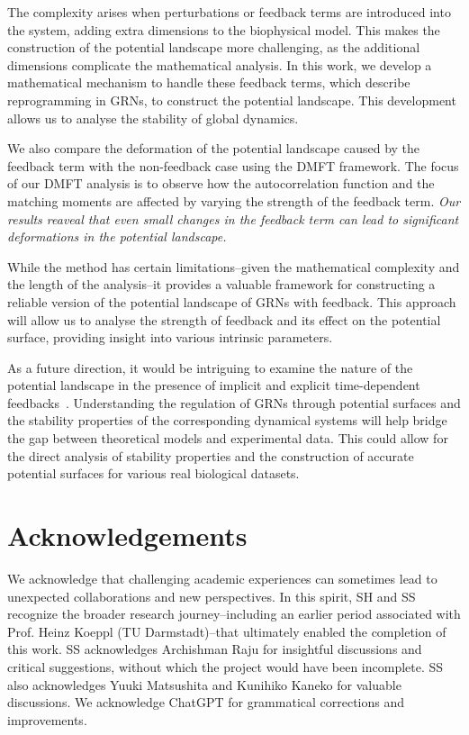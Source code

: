\documentclass[reprint,amsmath,amssymb,aps]{revtex4-2}
\begin{document}
The complexity arises when perturbations or feedback terms are introduced into the system, adding extra dimensions to the biophysical model. This makes the construction of the potential landscape more challenging, as the additional dimensions complicate the mathematical analysis. In this work, we develop a mathematical mechanism to handle these feedback terms, which describe reprogramming in GRNs, to construct the potential landscape. This development allows us to analyse the stability of global dynamics.

We also compare the deformation of the potential landscape caused by the feedback term with the non-feedback case using the DMFT framework. %
The focus of our DMFT analysis is to observe how the autocorrelation function and the matching moments are affected by varying the strength of the feedback term. \emph{Our results reaveal that even small changes in the feedback term can lead to significant deformations in the potential landscape.}

While the method has certain limitations--given the mathematical complexity and the length of the analysis--it provides a valuable framework for constructing a reliable version of the potential landscape of GRNs with feedback. This approach will allow us to analyse the strength of feedback and its effect on the potential surface, providing insight into various intrinsic parameters.

As a future direction, it would be intriguing to examine the nature of the potential landscape in the presence of implicit and explicit time-dependent feedbacks~\cite{matsushita2023generic,matsushita2022dynamical}. Understanding the regulation of GRNs through potential surfaces and the stability properties of the corresponding dynamical systems will help bridge the gap between theoretical models and experimental data. This could allow for the direct analysis of stability properties and the construction of accurate potential surfaces for various real biological datasets.


\section*{Acknowledgements}
We acknowledge that challenging academic experiences can sometimes lead to unexpected collaborations and new perspectives. In this spirit, SH and SS recognize the broader research journey--including an earlier period associated with Prof. Heinz Koeppl (TU Darmstadt)--that ultimately enabled the completion of this work. SS acknowledges Archishman Raju for insightful discussions and critical suggestions, without which the project would have been incomplete. SS also acknowledges Yuuki Matsushita and Kunihiko Kaneko for valuable discussions. We acknowledge ChatGPT for grammatical corrections and improvements.
\end{document}
